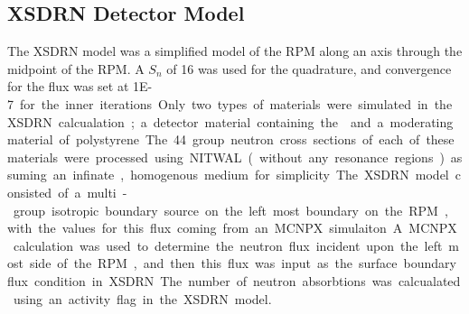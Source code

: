 \subsection{XSDRN Detector Model}
The XSDRN model was a simplified model of the RPM along an axis through the midpoint of the RPM.
A $S_n$ of 16 was used for the quadrature, and convergence for the flux was set at \SI{1E-7} for the inner iterations.
Only two types of materials were simulated in the XSDRN calcualation; a detector material containing the  and a moderating material of polystyrene.
The 44 group neutron cross sections of each of these materials were processed using NITWAL (without any resonance regions) assuming an infinate, homogenous medium for simplicity.
The XSDRN model consisted of a multi-group isotropic boundary source on the left most boundary on the RPM, with the values for this flux coming from an MCNPX simulaiton.
A MCNPX calculation was used to determine the neutron flux incident upon the left most side of the RPM, and then this flux was input as the surface boundary flux condition in XSDRN.
The number of neutron absorbtions was calcualated using an activity flag in the XSDRN model.
